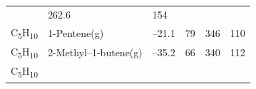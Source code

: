 \documentclass[
]{book}
\theoremstyle{definition}
\theoremstyle{definition}
\theoremstyle{definition}
\theoremstyle{remark}
\begin{document}
\begin{longtable}[]{@{}llllll@{}}
\begin{minipage}[t]{0.15\columnwidth}
\strut
\end{minipage} & \begin{minipage}[t]{0.14\columnwidth}\raggedright
262.6\strut
\end{minipage} & \begin{minipage}[t]{0.14\columnwidth}\raggedright
154\strut
\end{minipage}\tabularnewline
\begin{minipage}[t]{0.07\columnwidth}\raggedright
C\textsubscript{5}H\textsubscript{10}\strut
\end{minipage} & \begin{minipage}[t]{0.17\columnwidth}\raggedright
1-Pentene(g)\strut
\end{minipage} & \begin{minipage}[t]{0.15\columnwidth}\raggedright
--21.1\strut
\end{minipage} & \begin{minipage}[t]{0.15\columnwidth}\raggedright
79\strut
\end{minipage} & \begin{minipage}[t]{0.14\columnwidth}\raggedright
346\strut
\end{minipage} & \begin{minipage}[t]{0.14\columnwidth}\raggedright
110\strut
\end{minipage}\tabularnewline
\begin{minipage}[t]{0.07\columnwidth}\raggedright
C\textsubscript{5}H\textsubscript{10}\strut
\end{minipage} & \begin{minipage}[t]{0.17\columnwidth}\raggedright
2-Methyl--1-butene(g)\strut
\end{minipage} & \begin{minipage}[t]{0.15\columnwidth}\raggedright
--35.2\strut
\end{minipage} & \begin{minipage}[t]{0.15\columnwidth}\raggedright
66\strut
\end{minipage} & \begin{minipage}[t]{0.14\columnwidth}\raggedright
340\strut
\end{minipage} & \begin{minipage}[t]{0.14\columnwidth}\raggedright
112\strut
\end{minipage}\tabularnewline
\begin{minipage}[t]{0.07\columnwidth}\raggedright
C\textsubscript{5}H\textsubscript{10}\strut
\end{minipage} & \begin{minipage}[t]{0.17\columnwidth}\raggedright

\end{minipage}
\end{longtable}
\end{document}
